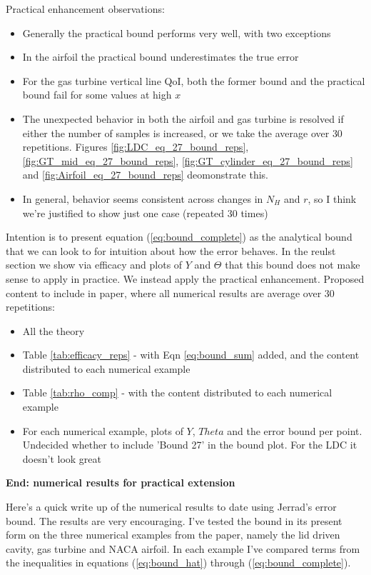 \documentclass{report}
\begin{document}
Practical enhancement observations: 
\begin{itemize}
\item Generally the practical bound performs very well, with two exceptions
\item In the airfoil the practical bound underestimates the true error
\item For the gas turbine vertical line QoI, both the former bound and the practical bound fail for some values at high $x$
\item The unexpected behavior in both the airfoil and gas turbine is resolved if either the number of samples is increased, or we take the average over $30$ repetitions. Figures \ref{fig:LDC_eq_27_bound_reps}, \ref{fig:GT_mid_eq_27_bound_reps}, \ref{fig:GT_cylinder_eq_27_bound_reps} and \ref{fig:Airfoil_eq_27_bound_reps} deomonstrate this. 
\item In general, behavior seems consistent across changes in $N_H$ and $r$, so I think we're justified to show just one case (repeated 30 times)
\end{itemize}

Intention is to present equation (\ref{eq:bound_complete}) as the analytical bound that we can look to for intuition about how the error behaves. In the reulst section we show via efficacy and plots of $Y$ and $\Theta$ that this bound does not make sense to apply in practice. We instead apply the practical enhancement.  Proposed content to include in paper, where all numerical results are average over 30 repetitions: 
\begin{itemize}
\item All the theory
\item Table \ref{tab:efficacy_reps} - with Eqn \ref{eq:bound_sum} added, and the content distributed to each numerical example
\item Table \ref{tab:rho_comp} - with the content distributed to each numerical example
\item For each numerical example, plots of $Y$, $Theta$ and the error bound per point. Undecided whether to include 'Bound 27' in the bound plot. For the LDC it doesn't look great
\end{itemize}

\begin{center}
\bf{End: numerical results for practical extension}
\end{center}

Here's a quick write up of the numerical results to date using Jerrad's error bound. The results are very encouraging. I've tested the bound in its present form on the three numerical examples from the paper, namely the lid driven cavity, gas turbine and NACA airfoil. In each example I've compared terms from the inequalities in equations (\ref{eq:bound_hat}) through (\ref{eq:bound_complete}). 
\end{document}

